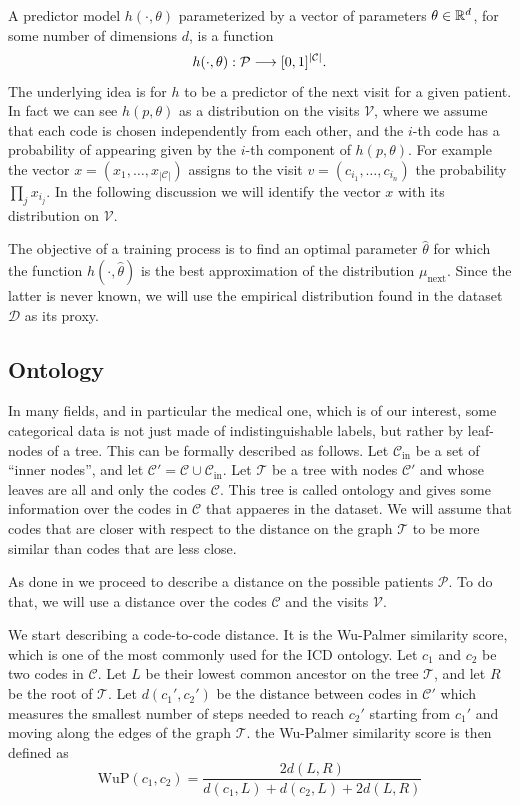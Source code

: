 \documentclass[]{marticle}
\newcommand{\ds}{\mathcal{D}}
\newcommand{\codes}{\mathcal{C}}
\newcommand{\codesin}{\mathcal{C}_\text{in}}
\newcommand{\tree }{\mathcal{T}}
\newcommand{\patients}{\mathcal{P}}
\newcommand{\visits}{\mathcal{V}}
\begin{document}
A predictor model $h(\cdot, \theta)$ parameterized by a vector of parameters $\theta \in \mathbb{R}^d$, for some
number of dimensions $d$, is a function
$$ h(\cdot, \theta) : \patients \arr [0,1]^{|\codes|}. $$
The underlying idea is for $h$ to be a predictor of the next visit for a given patient. In fact we
can see $h(p, \theta)$ as a distribution on the visits $\visits$, where we assume that each code is
chosen independently from each other, and the $i$-th code has a probability of appearing given by
the $i$-th component of $h(p, \theta)$. For example the vector $x=(x_1, \dots, x_{|\codes|})$ assigns
to the visit $v=(c_{i_1}, \dots, c_{i_n})$ the probability $\prod_j x_{i_j}$. In the following
discussion we will identify the vector $x$ with its distribution on $\visits$.

The objective of a training process is to find an optimal parameter $\hat{\theta}$ for which the
function $h(\cdot, \hat{\theta})$ is the best approximation of the distribution $\mu_\text{next}$. Since the
latter is never known, we will use the empirical distribution found in the dataset $\ds$ as its proxy.

\subsection{Ontology} \label{sect-ontology}

In many fields, and in particular the medical one, which is of our interest, some categorical data
is not just made of indistinguishable labels, but rather by leaf-nodes of a tree. This can be
formally described as follows. Let $\codesin$ be a set of ``inner nodes'', and let $\codes' = \codes
\cup \codesin$. Let $\tree$ be a tree with nodes $\codes'$ and whose leaves are all and only the
codes $\codes$. This tree is called ontology and gives some information over the codes in $\codes$
that appaeres in the dataset. We will assume that codes that are closer with respect to the distance
on the graph $\tree$ to be more similar than codes that are less close.

As done in \cite{panigutti-xai} we proceed to describe a distance on the possible patients $\patients$. To
do that, we will use a distance over the codes $\codes$ and the visits $\visits$.

We start describing a code-to-code distance. It is the Wu-Palmer similarity score, which is one of
the most commonly used for the ICD ontology. Let $c_1$ and $c_2$ be two codes in $\codes$. Let $L$
be their lowest common ancestor on the tree $\tree$, and let $R$ be the root of $\tree$. Let $d(c_1',
c_2')$ be the distance between codes in $\codes'$ which measures the smallest number of steps needed
to reach $c_2'$ starting from $c_1'$ and moving along the edges of the graph $\tree$. the Wu-Palmer
similarity score is then defined as
$$ \text{WuP}(c_1, c_2) = \frac{2 d(L,R)}{d(c_1,L) + d(c_2, L) + 2d(L,R)} $$
\end{document}
